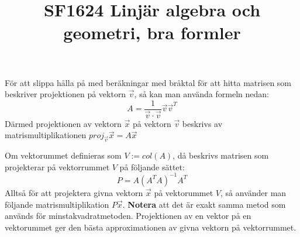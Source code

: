 \documentclass{report}
\title{\Huge{SF1624 Linjär algebra och geometri, bra formler}}
\author{\huge{}}
\date{}
\begin{document}
\maketitle
\newpage
{}
\tableofcontents
\pagebreak

\chapter{}

{
	För att slippa hålla på med beräkningar med bråktal för att hitta matrisen som beskriver projektionen på vektorn $ \vec{v}  $, så kan man använda formeln nedan:
\[
A = \frac{1}{\vec{v} \cdot \vec{v} } \vec{v} \vec{v}^T
\]
Därmed projektionen av vektorn $ \vec{x} $ på vektorn $ \vec{v}  $ beskrivs av matrismultiplikationen $ proj_{ \vec{v} } \vec{x} = A \vec{x}  $  
}

{
Om vektorummet definieras som $ V := col(A) $, då beskrivs matrisen som projekterar på vektorrummet $ V $ på följande sättet:
\[
	P = A (A^T A)^{-1} A^T
\]
Alltså för att projektera givna vektorn $ \vec{x}  $ på vektorummet $ V $, så använder man följande matrismultiplikation $ P \vec{x}  $. \textbf{Notera} att det är exakt samma metod som används för minstakvadratmetoden. Projektionen av en vektor på en vektorummet ger den bästa approximationen av givna vektorn på vektorrummet. 
}
\end{document}
